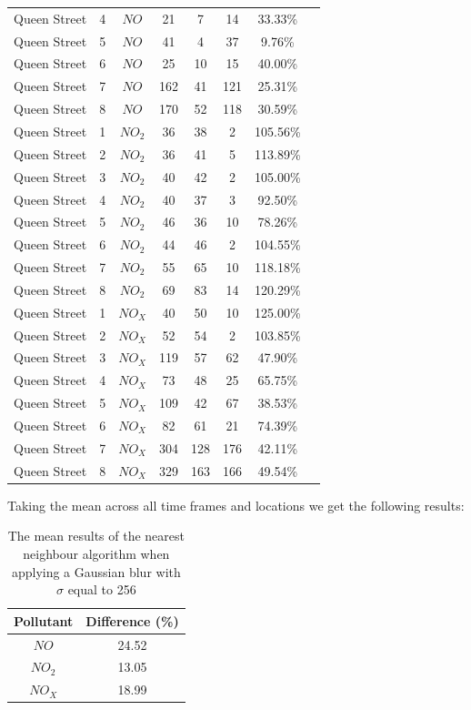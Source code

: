 \begin{longtable}{|c|c|c|c|c|c|c|c|}
				Queen Street & 4 & $NO$ & 21 & 7 & 14 & 33.33\% \\
				Queen Street & 5 & $NO$ & 41 & 4 & 37 & 9.76\% \\
				Queen Street & 6 & $NO$ & 25 & 10 & 15 & 40.00\% \\
				Queen Street & 7 & $NO$ & 162 & 41 & 121 & 25.31\% \\
				Queen Street & 8 & $NO$ & 170 & 52 & 118 & 30.59\% \\
				Queen Street & 1 & $NO_{2}$ & 36 & 38 & 2 & 105.56\% \\
				Queen Street & 2 & $NO_{2}$ & 36 & 41 & 5 & 113.89\% \\
				Queen Street & 3 & $NO_{2}$ & 40 & 42 & 2 & 105.00\% \\
				Queen Street & 4 & $NO_{2}$ & 40 & 37 & 3 & 92.50\% \\
				Queen Street & 5 & $NO_{2}$ & 46 & 36 & 10 & 78.26\% \\
				Queen Street & 6 & $NO_{2}$ & 44 & 46 & 2 & 104.55\% \\
				Queen Street & 7 & $NO_{2}$ & 55 & 65 & 10 & 118.18\% \\
				Queen Street & 8 & $NO_{2}$ & 69 & 83 & 14 & 120.29\% \\
				Queen Street & 1 & $NO_{X}$ & 40 & 50 & 10 & 125.00\% \\
				Queen Street & 2 & $NO_{X}$ & 52 & 54 & 2 & 103.85\% \\
				Queen Street & 3 & $NO_{X}$ & 119 & 57 & 62 & 47.90\% \\
				Queen Street & 4 & $NO_{X}$ & 73 & 48 & 25 & 65.75\% \\
				Queen Street & 5 & $NO_{X}$ & 109 & 42 & 67 & 38.53\% \\
				Queen Street & 6 & $NO_{X}$ & 82 & 61 & 21 & 74.39\% \\
				Queen Street & 7 & $NO_{X}$ & 304 & 128 & 176 & 42.11\% \\
				Queen Street & 8 & $NO_{X}$ & 329 & 163 & 166 & 49.54\% \\
				\hline
			\end{longtable}

			Taking the mean across all time frames and locations we get the following results:

			\begin{table}[H]
				\centering
	    		\begin{tabular}{|c|c|}
	    			\hline
					Pollutant & Difference (\%) \\ \hline
					$NO$ & 24.52 \\
					$NO_{2}$ & 13.05 \\
					$NO_{X}$ & 18.99 \\
					\hline 
				\end{tabular}
				\caption{The mean results of the nearest neighbour algorithm when applying a Gaussian blur with $\sigma$ equal to 256}
				\label{tab:nearest_neighbour_convolution_results}
			\end{table}

